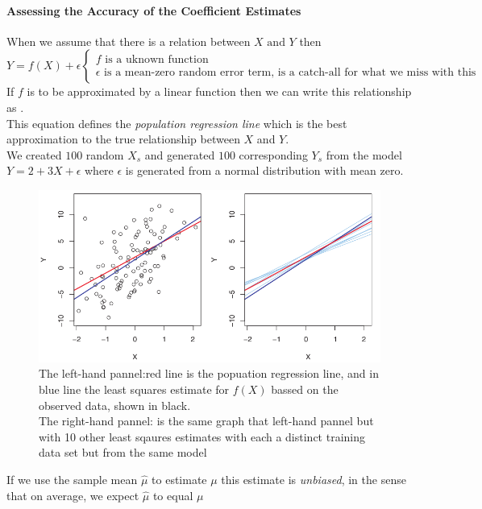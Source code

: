 \paragraph{Assessing the Accuracy of the Coefficient Estimates}
When we assume that there is a relation between $X\text{ and }Y$ then
$Y=f\left( X \right)+\epsilon\begin{cases}f\text{ is a uknown function
 }\\\epsilon\text{ is a mean-zero random error term, is a catch-all for
what we miss with this simple model}\end{cases}$\\If $f$ is to be 
approximated by a linear function then we can write this relationship
as .\\This equation defines the
\emph{population regression line} which is the best approximation to
the true relationship between $X$ and $Y$.\\ We created $100$ random
$X_{s}$ and generated $100$ corresponding $Y_{s}$ from the model $Y=2+
3X+\epsilon$ where $\epsilon$ is generated from a normal distribution
with mean zero.
\begin{figure}[H]
  \centering
  \includegraphics[width=\textwidth]{./chap/1chap/2sec/1images/3_leastSquaredErrorLineVsPopulationRegressionLine.png}
  \caption{The left-hand pannel:red line is the popuation regression
  line, and in blue line the least squares estimate for $f(X)$ bassed
  on the observed data, shown in black.\\The right-hand pannel: is the
  same graph that left-hand pannel but with 10 other least sqaures
  estimates with each a distinct training data set but from the same
  model}
  \label{fig:2.3}
\end{figure}
If we use the sample mean $
\widehat{\mu}$ to estimate $\mu$ this estimate is \emph{unbiased}, in
the sense that on average, we expect $\widehat{\mu}$ to equal $\mu$\\
